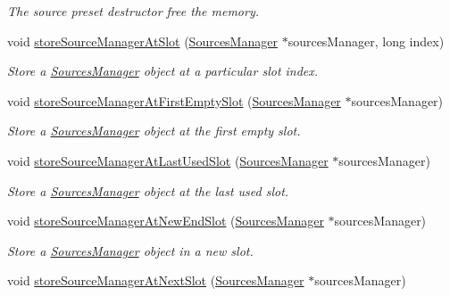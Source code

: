 \begin{DoxyCompactItemize}
\begin{DoxyCompactList}\small\item\em The source preset destructor free the memory. \end{DoxyCompactList}\item 
void \hyperlink{class_hoa2_d_1_1_sources_preset_aa5a9db953bfffc3af48c7f052ff7d114}{store\-Source\-Manager\-At\-Slot} (\hyperlink{class_hoa2_d_1_1_sources_manager}{Sources\-Manager} $\ast$sources\-Manager, long index)
\begin{DoxyCompactList}\small\item\em Store a \hyperlink{class_hoa2_d_1_1_sources_manager}{Sources\-Manager} object at a particular slot index. \end{DoxyCompactList}\item 
void \hyperlink{class_hoa2_d_1_1_sources_preset_aafece46a576cec4a8c24ff04393a6879}{store\-Source\-Manager\-At\-First\-Empty\-Slot} (\hyperlink{class_hoa2_d_1_1_sources_manager}{Sources\-Manager} $\ast$sources\-Manager)
\begin{DoxyCompactList}\small\item\em Store a \hyperlink{class_hoa2_d_1_1_sources_manager}{Sources\-Manager} object at the first empty slot. \end{DoxyCompactList}\item 
void \hyperlink{class_hoa2_d_1_1_sources_preset_ade9e266d04987e3336aa30ee06026a5c}{store\-Source\-Manager\-At\-Last\-Used\-Slot} (\hyperlink{class_hoa2_d_1_1_sources_manager}{Sources\-Manager} $\ast$sources\-Manager)
\begin{DoxyCompactList}\small\item\em Store a \hyperlink{class_hoa2_d_1_1_sources_manager}{Sources\-Manager} object at the last used slot. \end{DoxyCompactList}\item 
void \hyperlink{class_hoa2_d_1_1_sources_preset_a67415a5175c688503b4f9621f558a4b6}{store\-Source\-Manager\-At\-New\-End\-Slot} (\hyperlink{class_hoa2_d_1_1_sources_manager}{Sources\-Manager} $\ast$sources\-Manager)
\begin{DoxyCompactList}\small\item\em Store a \hyperlink{class_hoa2_d_1_1_sources_manager}{Sources\-Manager} object in a new slot. \end{DoxyCompactList}\item 
void \hyperlink{class_hoa2_d_1_1_sources_preset_a2ebb6dc23c37ef95c4612ee093d5df2e}{store\-Source\-Manager\-At\-Next\-Slot} (\hyperlink{class_hoa2_d_1_1_sources_manager}{Sources\-Manager} $\ast$sources\-Manager)

\end{DoxyCompactItemize}
